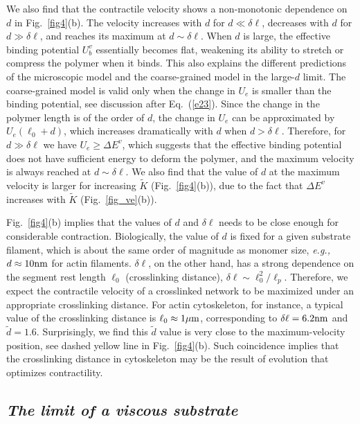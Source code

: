 \documentclass[twocolumn,prl,english]{revtex4-1}
\begin{document}
We also find that the contractile velocity shows a non-monotonic dependence on $d$ in Fig.~\ref{fig4}(b). The velocity increases with $d$ for $d\ll \delta \ell$,  decreases with $d$ for $d\gg \delta \ell$, and reaches its maximum at $d\sim \delta \ell$. When $d$ is large, the effective binding potential $U_b^v$ essentially becomes flat, weakening its ability to stretch or compress the polymer  when  it binds. This also explains the different predictions of the microscopic model and the coarse-grained model in the large-$d$ limit. The coarse-grained model is valid only when the change in $U_e$ is smaller than the binding potential, see discussion after Eq.~(\ref{e23}). Since the change in the polymer length is of the order of $d$, the change in $U_e$ can be approximated by $U_e(\ell_0+d)$, which increases dramatically with $d$ when $d>\delta \ell$. Therefore, for $d\gg \delta \ell$ we have $U_e \geq\Delta E^v$, which suggests that the effective binding potential  does not have  sufficient energy to deform the polymer, and the maximum velocity is always reached at $d\sim \delta \ell$. We also find that the value of $d$ at the maximum velocity is larger for increasing $\tilde K$ (Fig.~\ref{fig4}(b)), due to the fact that $\Delta E^v$ increases with $\tilde K$ (Fig.~\ref{fig_ve}(b)). 

Fig.~\ref{fig4}(b) implies that the values of $d$ and $\delta \ell$ needs to be close enough for considerable contraction. Biologically, the value of $d$ is fixed for a given substrate filament, which is about the same order of magnitude  as monomer size, {\it e.g.,} $d\approx 10 \rm nm$ for actin filaments. $\delta \ell$, on the other hand, has a strong dependence on the segment rest length $\ell_0$ (crosslinking distance),  $\delta \ell\sim\ell_0^2/\ell_p$. Therefore, we expect the contractile velocity of a crosslinked network to be maximized under an appropriate crosslinking distance. For actin cytoskeleton, for instance, a typical value of the crosslinking distance is $\ell_0\approx 1 \rm \mu m$, corresponding to $\delta \ell = 6.2 \rm nm$ and $\tilde d=1.6$. Surprisingly, we find this $\tilde d$ value is very close to the maximum-velocity position, see dashed yellow line in Fig.~\ref{fig4}(b). Such coincidence implies that the crosslinking distance in cytoskeleton may be the result of evolution that optimizes contractility. 


\subsection{\it The limit of a viscous substrate}
\label{s3a}
\end{document}
